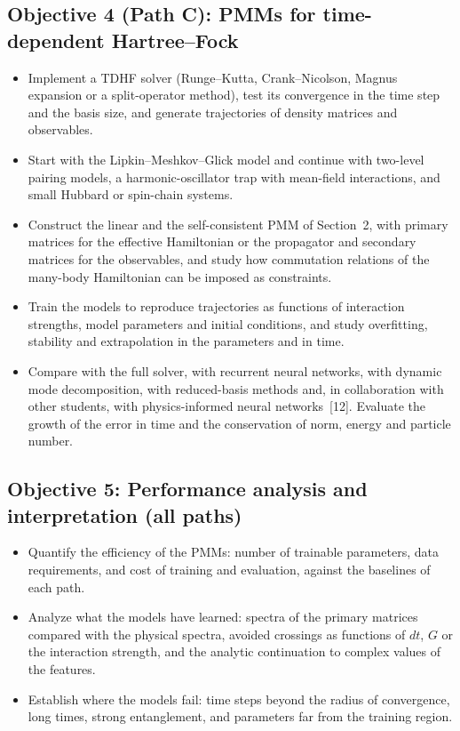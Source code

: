 \documentclass[12pt,a4paper]{article}
\begin{document}
\subsection*{Objective 4 (Path C): PMMs for time-dependent Hartree--Fock}
\begin{itemize}
  \item Implement a TDHF solver (Runge--Kutta, Crank--Nicolson, Magnus
  expansion or a split-operator method), test its convergence in the
  time step and the basis size, and generate trajectories of density
  matrices and observables.
  \item Start with the Lipkin--Meshkov--Glick model and continue with
  two-level pairing models, a harmonic-oscillator trap with mean-field
  interactions, and small Hubbard or spin-chain systems.
  \item Construct the linear and the self-consistent PMM of Section~2,
  with primary matrices for the effective Hamiltonian or the
  propagator and secondary matrices for the observables, and study
  how commutation relations of the many-body Hamiltonian can be
  imposed as constraints.
  \item Train the models to reproduce trajectories as functions of
  interaction strengths, model parameters and initial conditions, and
  study overfitting, stability and extrapolation in the parameters and
  in time.
  \item Compare with the full solver, with recurrent neural networks,
  with dynamic mode decomposition, with reduced-basis methods and, in
  collaboration with other students, with physics-informed neural
  networks~[12].  Evaluate the growth of the error in time and the
  conservation of norm, energy and particle number.
\end{itemize}

\subsection*{Objective 5: Performance analysis and interpretation (all paths)}
\begin{itemize}
  \item Quantify the efficiency of the PMMs: number of trainable
  parameters, data requirements, and cost of training and evaluation,
  against the baselines of each path.
  \item Analyze what the models have learned: spectra of the primary
  matrices compared with the physical spectra, avoided crossings as
  functions of $dt$, $G$ or the interaction strength, and the
  analytic continuation to complex values of the features.
  \item Establish where the models fail: time steps beyond the radius
  of convergence, long times, strong entanglement, and parameters far
  from the training region.
\end{itemize}
\end{document}
